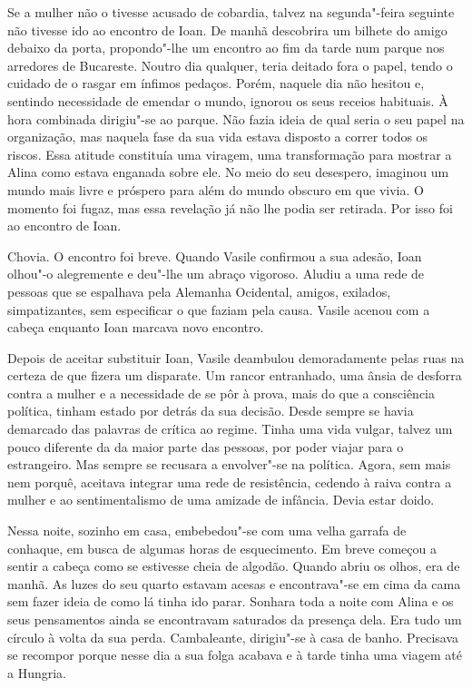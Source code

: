 Se a mulher não o tivesse acusado de cobardia, talvez na segunda"-feira
seguinte não tivesse ido ao encontro de Ioan. De manhã descobrira um
bilhete do amigo debaixo da porta, propondo"-lhe um encontro ao fim da
tarde num parque nos arredores de Bucareste. Noutro dia qualquer, teria
deitado fora o papel, tendo o cuidado de o rasgar em ínfimos pedaços.
Porém, naquele dia não hesitou e, sentindo necessidade de emendar o
mundo, ignorou os seus receios habituais. À hora combinada dirigiu"-se ao
parque. Não fazia ideia de qual seria o seu papel na organização,
mas naquela fase da sua vida estava disposto a correr todos os riscos.
Essa atitude constituía uma viragem, uma transformação para mostrar a
Alina como estava enganada sobre ele. No meio do seu desespero,
imaginou um mundo mais livre e próspero para além do mundo obscuro em
que vivia. O momento foi fugaz, mas essa revelação já não lhe podia ser
retirada. Por isso foi ao encontro de Ioan.

Chovia. O encontro foi
breve. Quando Vasile confirmou a sua adesão, Ioan olhou"-o alegremente
e deu"-lhe um abraço vigoroso. Aludiu a uma rede de pessoas que se
espalhava pela Alemanha Ocidental, amigos, exilados, simpatizantes, sem
especificar o que faziam pela causa.
Vasile acenou com a cabeça enquanto Ioan marcava novo encontro.

Depois de aceitar substituir Ioan, Vasile deambulou demoradamente pelas
ruas na certeza de que fizera um disparate. Um rancor entranhado, uma
ânsia de desforra contra a mulher e a necessidade de se pôr à prova,
mais do que a consciência política, tinham estado por detrás da sua
decisão. Desde sempre se havia demarcado das palavras de crítica ao
regime. Tinha uma vida vulgar, talvez um pouco diferente da da maior
parte das pessoas, por poder viajar para o estrangeiro. Mas sempre se
recusara a envolver"-se na política. Agora, sem mais nem porquê, aceitava
integrar uma rede de resistência, cedendo à raiva contra a mulher e ao
sentimentalismo de uma amizade de infância. Devia estar doido.

Nessa noite, sozinho em casa, embebedou"-se com uma velha garrafa de
conhaque, em busca de algumas horas de esquecimento. Em breve começou a
sentir a cabeça como
se estivesse cheia de algodão. Quando abriu os olhos, era de manhã. As
luzes do seu quarto estavam acesas e encontrava"-se em cima da cama sem
fazer ideia de como lá tinha ido parar. Sonhara toda a noite com Alina e
os seus pensamentos ainda se encontravam saturados da presença dela. Era
tudo um círculo à volta da sua perda. Cambaleante, dirigiu"-se à casa
de banho. Precisava se recompor porque nesse dia a sua folga
acabava e à tarde tinha uma viagem até a Hungria.

